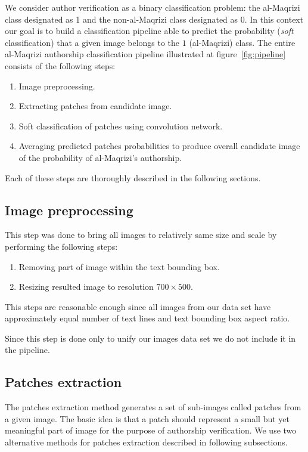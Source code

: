 \documentclass[conference,a4paper,twocolumn]{IEEEtran}
\newcommand{\convnet}{ConvNet~} %
\begin{document}
We consider author verification as a binary classification problem: the al-Maqrizi class designated as 1 and the non-al-Maqrizi class designated as 0. In this context our goal is to build a classification pipeline able to predict the probability (\textit{soft} classification) that a given image belongs to the $1$ (al-Maqrizi) class. The entire al-Maqrizi authorship classification pipeline illustrated at figure~\ref{fig:pipeline} consists of the following steps:

\begin{enumerate}[start=0]
	\item Image preprocessing.
	\item Extracting patches from candidate image.
	\item Soft classification of patches using convolution network.
	\item Averaging predicted patches probabilities to produce overall candidate image of the probability of al-Maqrizi's authorship.
\end{enumerate}

Each of these steps are thoroughly described in the following sections.	



\subsection{Image preprocessing}
This step was done to bring all images to relatively same size and scale by performing the following steps:
\begin{enumerate}
	\item Removing part of image within the text bounding box.
	\item Resizing resulted image to resolution $700\times 500$.
\end{enumerate}
This steps are reasonable enough since all images from our data set have approximately equal number of text lines and text bounding box aspect ratio. 

Since this step is done only to unify our images data set we do not include it in the pipeline.

\subsection{Patches extraction}
The patches extraction method generates a set of sub-images called patches from a given image. The basic idea is that a patch should represent a small but yet meaningful part of image for the purpose of authorship verification. We use two alternative methods for patches extraction described in following subsections.
\end{document}
